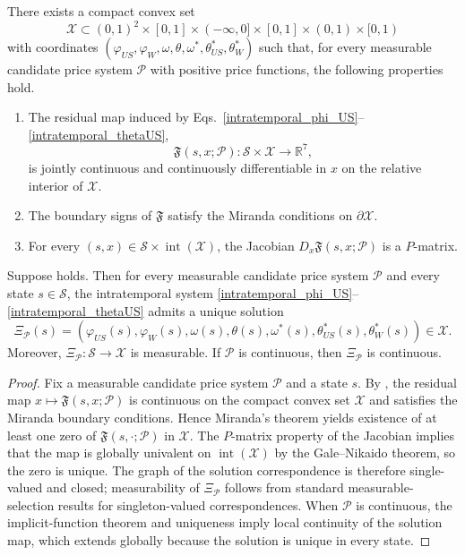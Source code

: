 \documentclass{article}
\begin{document}
\begin{ass}\label{ass_intratemporal_regular}
There exists a compact convex set
\[
\mathcal X
\subset
(0,1)^2\times[0,1]\times(-\infty,0]\times[0,1]\times(0,1)\times[0,1)
\]
with coordinates $(\varphi_{US},\varphi_W,\omega,\theta,\omega^*,\theta_{US}^*,\theta_W^*)$ such that, for every measurable candidate price system $\mathcal P$ with positive price functions, the following properties hold.
\begin{enumerate}
    \item The residual map induced by Eqs.~\eqref{intratemporal_phi_US}--\eqref{intratemporal_thetaUS},
    \[
    \mathfrak F(s,x;\mathcal P):\mathcal S\times\mathcal X\to\mathbb R^7,
    \]
    is jointly continuous and continuously differentiable in $x$ on the relative interior of $\mathcal X$.
    \item The boundary signs of $\mathfrak F$ satisfy the Miranda conditions on $\partial\mathcal X$.
    \item For every $(s,x)\in\mathcal S\times\operatorname{int}(\mathcal X)$, the Jacobian $D_x\mathfrak F(s,x;\mathcal P)$ is a $P$-matrix.
\end{enumerate}
\end{ass}

\begin{prop}\label{prop_intratemporal_policy_map}
Suppose  holds. Then for every measurable candidate price system $\mathcal P$ and every state $s\in\mathcal S$, the intratemporal system \eqref{intratemporal_phi_US}--\eqref{intratemporal_thetaUS} admits a unique solution
\[
\Xi_{\mathcal P}(s)
=(\varphi_{US}(s),\varphi_W(s),\omega(s),\theta(s),\omega^*(s),\theta_{US}^*(s),\theta_W^*(s))
\in\mathcal X.
\]
Moreover, $\Xi_{\mathcal P}:\mathcal S\to\mathcal X$ is measurable. If $\mathcal P$ is continuous, then $\Xi_{\mathcal P}$ is continuous.
\end{prop}

\begin{proof}
Fix a measurable candidate price system $\mathcal P$ and a state $s$. By , the residual map $x\mapsto\mathfrak F(s,x;\mathcal P)$ is continuous on the compact convex set $\mathcal X$ and satisfies the Miranda boundary conditions. Hence Miranda's theorem yields existence of at least one zero of $\mathfrak F(s,\cdot;\mathcal P)$ in $\mathcal X$. The $P$-matrix property of the Jacobian implies that the map is globally univalent on $\operatorname{int}(\mathcal X)$ by the Gale--Nikaido theorem, so the zero is unique. The graph of the solution correspondence is therefore single-valued and closed; measurability of $\Xi_{\mathcal P}$ follows from standard measurable-selection results for singleton-valued correspondences. When $\mathcal P$ is continuous, the implicit-function theorem and uniqueness imply local continuity of the solution map, which extends globally because the solution is unique in every state.
\end{proof}
\end{document}
